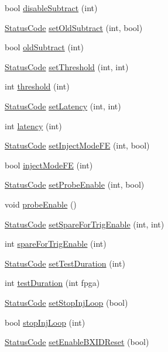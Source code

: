 \begin{DoxyCompactItemize}
bool \hyperlink{classFEB__v1_a3d224acca0807603d14b72cff6359b3f}{disableSubtract} (int)
\item 
\hyperlink{classStatusCode}{StatusCode} \hyperlink{classFEB__v1_aec8198d5c03ddc5dd9151683f9506d00}{setOldSubtract} (int, bool)
\item 
bool \hyperlink{classFEB__v1_a5b277ace76b9e511c055ad94d241dd61}{oldSubtract} (int)
\item 
\hyperlink{classStatusCode}{StatusCode} \hyperlink{classFEB__v1_a02416559cdd68e8aa57f47ce7cf6788c}{setThreshold} (int, int)
\item 
int \hyperlink{classFEB__v1_a71e54700c59857844905c879e4b3d4fd}{threshold} (int)
\item 
\hyperlink{classStatusCode}{StatusCode} \hyperlink{classFEB__v1_ae3252ed2737b5c93395da201b427b871}{setLatency} (int, int)
\item 
int \hyperlink{classFEB__v1_a68050d232efd8d6568910b09a2c18f62}{latency} (int)
\item 
\hyperlink{classStatusCode}{StatusCode} \hyperlink{classFEB__v1_aea3983d847c7b8053485ddd16af65680}{setInjectModeFE} (int, bool)
\item 
bool \hyperlink{classFEB__v1_adad5a9a1dc8f650a59e6edb310451cab}{injectModeFE} (int)
\item 
\hyperlink{classStatusCode}{StatusCode} \hyperlink{classFEB__v1_abb013a3441c02f57cea07a244554fdd5}{setProbeEnable} (int, bool)
\item 
void \hyperlink{classFEB__v1_aa9a047f616c6affac88a8d9ec984013f}{probeEnable} ()
\item 
\hyperlink{classStatusCode}{StatusCode} \hyperlink{classFEB__v1_ae8e531b961f91ac974a75c43937acf78}{setSpareForTrigEnable} (int, int)
\item 
int \hyperlink{classFEB__v1_a76d86fb9e9be48e704257070675ae1cc}{spareForTrigEnable} (int)
\item 
\hyperlink{classStatusCode}{StatusCode} \hyperlink{classFEB__v1_a19d3dee6fa47408cf0aa136fb99ebe1c}{setTestDuration} (int)
\item 
int \hyperlink{classFEB__v1_a7f1db8ca9490172fce7603da9e703dec}{testDuration} (int fpga)
\item 
\hyperlink{classStatusCode}{StatusCode} \hyperlink{classFEB__v1_aaf8386be3d27ea22e389b0a6c7699af7}{setStopInjLoop} (bool)
\item 
bool \hyperlink{classFEB__v1_abfd23d8fbcea0415a7e8401110869a78}{stopInjLoop} (int)
\item 
\hyperlink{classStatusCode}{StatusCode} \hyperlink{classFEB__v1_a2ad20ff9db6a0ceef875d874bae214a9}{setEnableBXIDReset} (bool)

\end{DoxyCompactItemize}
